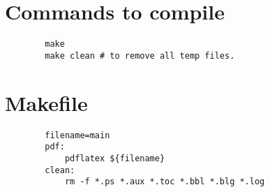 \documentclass[10pt]{article}
\begin{document}
\section{Commands to compile}
    \begin{verbatim}
        make
        make clean # to remove all temp files.
    \end{verbatim}



\section{Makefile}
    \begin{verbatim}
        filename=main
        pdf: 
            pdflatex ${filename}
        clean:
            rm -f *.ps *.aux *.toc *.bbl *.blg *.log
    \end{verbatim}
\end{document}
